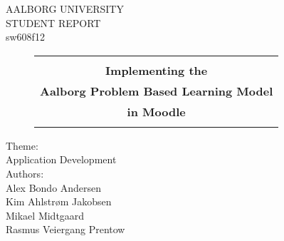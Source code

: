 \begin{center}
	\parbox{\textwidth}{
		\begin{center}

			\thispagestyle{empty}

			\LARGE
			AALBORG UNIVERSITY \\


			STUDENT REPORT \\
			sw608f12 \\ 
			
			\vspace{10mm}
			
			\begin{figure}[H]%
			\centering
			\LARGE
			\begin{tabular}{ c }
			\hline \\
				\textbf{Implementing the} \\
				\textbf{Aalborg Problem Based Learning Model} \\ 
				\textbf{in Moodle} \\ \\
			\hline 
			\end{tabular}
			\end{figure}

			Theme: \\
			Application Development \\
			 
			\vspace{10mm}
			Authors: \\
			Alex Bondo Andersen\\
			Kim Ahlstr\o{}m Jakobsen\\
			Mikael Midtgaard\\
			Rasmus Veiergang Prentow\\ 
			
			
		
			

		\end{center}		
	}
\end{center}